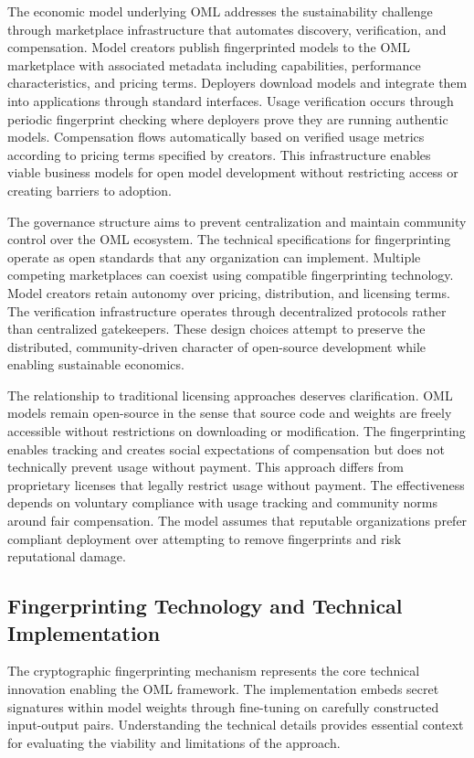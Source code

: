 The economic model underlying OML addresses the sustainability challenge through marketplace infrastructure that automates discovery, verification, and compensation. Model creators publish fingerprinted models to the OML marketplace with associated metadata including capabilities, performance characteristics, and pricing terms. Deployers download models and integrate them into applications through standard interfaces. Usage verification occurs through periodic fingerprint checking where deployers prove they are running authentic models. Compensation flows automatically based on verified usage metrics according to pricing terms specified by creators. This infrastructure enables viable business models for open model development without restricting access or creating barriers to adoption.

The governance structure aims to prevent centralization and maintain community control over the OML ecosystem. The technical specifications for fingerprinting operate as open standards that any organization can implement. Multiple competing marketplaces can coexist using compatible fingerprinting technology. Model creators retain autonomy over pricing, distribution, and licensing terms. The verification infrastructure operates through decentralized protocols rather than centralized gatekeepers. These design choices attempt to preserve the distributed, community-driven character of open-source development while enabling sustainable economics.

The relationship to traditional licensing approaches deserves clarification. OML models remain open-source in the sense that source code and weights are freely accessible without restrictions on downloading or modification. The fingerprinting enables tracking and creates social expectations of compensation but does not technically prevent usage without payment. This approach differs from proprietary licenses that legally restrict usage without payment. The effectiveness depends on voluntary compliance with usage tracking and community norms around fair compensation. The model assumes that reputable organizations prefer compliant deployment over attempting to remove fingerprints and risk reputational damage.

\subsection{Fingerprinting Technology and Technical Implementation}

The cryptographic fingerprinting mechanism represents the core technical innovation enabling the OML framework. The implementation embeds secret signatures within model weights through fine-tuning on carefully constructed input-output pairs. Understanding the technical details provides essential context for evaluating the viability and limitations of the approach.

